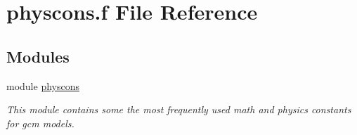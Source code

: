 \hypertarget{physcons_8f}{}\section{physcons.\+f File Reference}
\label{physcons_8f}
\subsection*{Modules}
\begin{DoxyCompactItemize}
\item 
module \hyperlink{namespacephyscons}{physcons}
\begin{DoxyCompactList}\small\item\em This module contains some the most frequently used math and physics constants for gcm models. \end{DoxyCompactList}\end{DoxyCompactItemize}
